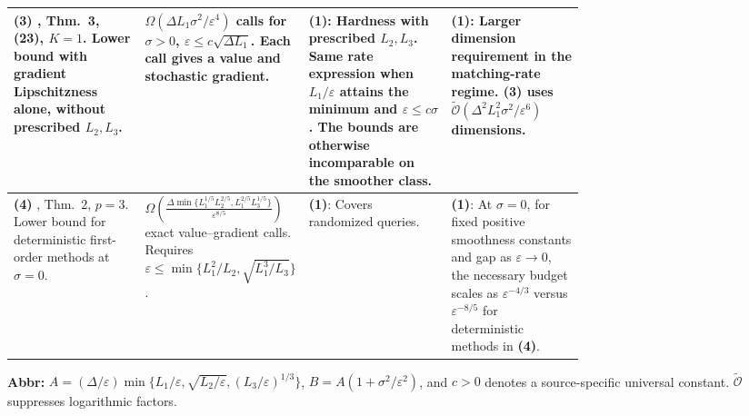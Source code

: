 \begin{table}[tp]
\begin{threeparttable}
\begin{tabularx}{\linewidth}{@{}>{\raggedright\arraybackslash}p{0.23\linewidth}>{\raggedright\arraybackslash}p{0.25\linewidth}>{\raggedright\arraybackslash}p{0.25\linewidth}>{\raggedright\arraybackslash}X@{}}
\midrule
\textbf{(3)} \citep{hnnlArjevani2023V2}, Thm.~3, (23), $K=1$. Lower bound with gradient Lipschitzness alone, without prescribed $L_2,L_3$.
& $\Omega(\Delta L_1\sigma^2/\varepsilon^4)$ calls for $\sigma>0$, $\varepsilon\le c\sqrt{\Delta L_1}$. Each call gives a value and stochastic gradient.
& \textbf{(1)}: Hardness with prescribed $L_2,L_3$. Same rate expression when $L_1/\varepsilon$ attains the minimum and $\varepsilon\le c\sigma$. The bounds are otherwise incomparable on the smoother class.
& \textbf{(1)}: Larger dimension requirement in the matching-rate regime. \textbf{(3)} uses $\widetilde{\mathcal{O}}(\Delta^2 L_1^2\sigma^2/\varepsilon^6)$ dimensions. \\
\midrule
\textbf{(4)} \citep{hdThirdCarmon2021II}, Thm.~2, $p=3$. Lower bound for deterministic first-order methods at $\sigma=0$.
& $\Omega\!\left(\frac{\Delta\min\{L_1^{1/5}L_2^{2/5},L_1^{2/5}L_3^{1/5}\}}{\varepsilon^{8/5}}\right)$ exact value--gradient calls. Requires $\varepsilon\le\min\{L_1^2/L_2,\sqrt{L_1^3/L_3}\}$.
& \textbf{(1)}: Covers randomized queries.
& \textbf{(1)}: At $\sigma=0$, for fixed positive smoothness constants and gap as $\varepsilon\to0$, the necessary budget scales as $\varepsilon^{-4/3}$ versus $\varepsilon^{-8/5}$ for deterministic methods in \textbf{(4)}. \\
\bottomrule
\end{tabularx}
\begin{tablenotes}[flushleft]\footnotesize
\item[] \textbf{Abbr:} $A=(\Delta/\varepsilon)\min\{L_1/\varepsilon,\sqrt{L_2/\varepsilon},(L_3/\varepsilon)^{1/3}\}$, $B=A(1+\sigma^2/\varepsilon^2)$, and $c>0$ denotes a source-specific universal constant. $\widetilde{\mathcal{O}}$ suppresses logarithmic factors.
\end{tablenotes}
\end{threeparttable}
\end{table}

